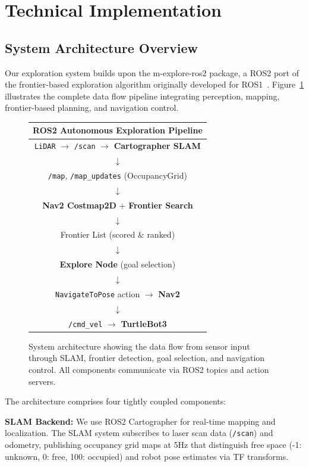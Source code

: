 \documentclass[conference]{IEEEtran}
\begin{document}
\section{Technical Implementation}

\subsection{System Architecture Overview}

Our exploration system builds upon the m-explore-ros2 package, a ROS2 port of the frontier-based exploration algorithm originally developed for ROS1~\cite{horner2016exploration}. Figure~\ref{fig:architecture} illustrates the complete data flow pipeline integrating perception, mapping, frontier-based planning, and navigation control.

\begin{figure}[h]
\centering
\small
\begin{tabular}{c}
\textbf{ROS2 Autonomous Exploration Pipeline} \\[0.5em]
\hline
\texttt{LiDAR} $\rightarrow$ \texttt{/scan} $\rightarrow$ \textbf{Cartographer SLAM} \\
$\downarrow$ \\
\texttt{/map}, \texttt{/map\_updates} (OccupancyGrid) \\
$\downarrow$ \\
\textbf{Nav2 Costmap2D} + \textbf{Frontier Search} \\
$\downarrow$ \\
Frontier List (scored \& ranked) \\
$\downarrow$ \\
\textbf{Explore Node} (goal selection) \\
$\downarrow$ \\
\texttt{NavigateToPose} action $\rightarrow$ \textbf{Nav2} \\
$\downarrow$ \\
\texttt{/cmd\_vel} $\rightarrow$ \textbf{TurtleBot3} \\
\hline
\end{tabular}
\caption{System architecture showing the data flow from sensor input through SLAM, frontier detection, goal selection, and navigation control. All components communicate via ROS2 topics and action servers.}
\label{fig:architecture}
\end{figure}

The architecture comprises four tightly coupled components:

\textbf{SLAM Backend:} We use ROS2 Cartographer for real-time mapping and localization. The SLAM system subscribes to laser scan data (\texttt{/scan}) and odometry, publishing occupancy grid maps at 5Hz that distinguish free space (-1: unknown, 0: free, 100: occupied) and robot pose estimates via TF transforms.
\end{document}

